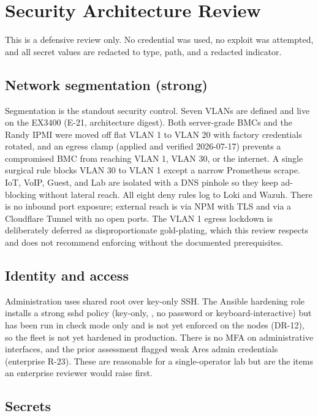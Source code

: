 \section{Security Architecture Review}\label{sec:security}

This is a defensive review only. No credential was used, no exploit was attempted, and all
secret values are redacted to type, path, and a redacted indicator.

\subsection{Network segmentation (strong)}

Segmentation is the standout security control. Seven VLANs are defined and live on the EX3400
(E-21, architecture digest). Both server-grade BMCs and the Randy IPMI were moved off flat
VLAN 1 to VLAN 20 with factory credentials rotated, and an egress clamp (applied and verified
2026-07-17) prevents a compromised BMC from reaching VLAN 1, VLAN 30, or the internet. A single
surgical rule blocks VLAN 30 to VLAN 1 except a narrow Prometheus scrape. IoT, VoIP, Guest, and
Lab are isolated with a DNS pinhole so they keep ad-blocking without lateral reach. All eight
deny rules log to Loki and Wazuh. There is no inbound port exposure; external reach is via NPM
with TLS and via a Cloudflare Tunnel with no open ports. The VLAN 1 egress lockdown is
deliberately deferred as disproportionate gold-plating, which this review respects and does not
recommend enforcing without the documented prerequisites.

\subsection{Identity and access}

Administration uses shared root over key-only SSH. The Ansible hardening role installs a strong
sshd policy (key-only, , no password or keyboard-interactive)
but has been run in check mode only and is not yet enforced on the nodes (DR-12), so the fleet is
not yet hardened in production. There is no MFA on administrative interfaces, and the prior
assessment flagged weak Ares admin credentials (enterprise R-23). These are reasonable for a
single-operator lab but are the items an enterprise reviewer would raise first.

\subsection{Secrets}

